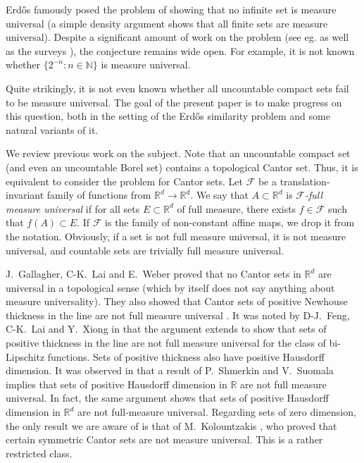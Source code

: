 \documentclass[12pt]{amsart}
\def\R{{\mathbb{R}}}
\def\N{{\mathbb{N}}}
\numberwithin{theorem}{section}
\numberwithin{equation}{section}
\begin{document}
Erd\H{o}s famously posed the problem of showing that no infinite set is measure universal (a simple density argument shows that all finite sets are measure universal). Despite a significant amount of work on the problem (see eg.\cite{Falconer84, Eigen85, Bourgain87, Kolountzakis97} as well as the surveys \cite{Svetic00, JLM25}), the conjecture remains wide open. For example, it is not known whether $\{ 2^{-n}:n\in\N\}$ is measure universal.

Quite strikingly, it is not even known whether all uncountable compact sets fail to be measure universal. The goal of the present paper is to make progress on this question, both in the setting of the Erd\H{o}s similarity problem and some natural variants of it.

We review previous work on the subject. Note that an uncountable compact set (and even an uncountable Borel set) contains a topological Cantor set. Thus, it is equivalent to consider the problem for Cantor sets. Let $\mathcal{F}$ be a translation-invariant family of functions from $\R^d\to\R^d$. We say that $A\subset\R^d$ is \emph{$\mathcal{F}$-full measure universal} if for all sets $E\subset\R^d$ of full measure, there exists $f\in\mathcal{F}$ such that $f(A)\subset E$. If $\mathcal{F}$ is the family of non-constant affine maps, we drop it from the notation. Obviously, if a set is not full measure universal, it is not measure universal, and countable sets are trivially full measure universal.

J.~Gallagher, C-K.~Lai and E.~Weber \cite[Theorem 1.4]{GLW23} proved that no Cantor sets in $\R^d$ are universal in a topological sense (which by itself does not say anything about measure universality). They also showed that Cantor sets of positive Newhouse thickness in the line are not full measure universal \cite[Theorem 1.5]{GLW23}. It was noted by D-J.~Feng, C-K.~Lai and Y.~Xiong in \cite{FLX24} that the argument extends to show that sets of positive thickness in the line are not full measure universal for the class of bi-Lipschitz functions. Sets of positive thickness also have positive Hausdorff dimension. It was observed in \cite[Corollary 3.8]{JLM25} that a result of P.~Shmerkin and V.~Suomala \cite[Theorem 13.1]{SS18} implies that sets of positive Hausdorff dimension in $\R$ are not full measure universal. In fact, the same argument shows that sets of positive Hausdorff dimension in $\R^d$ are not full-measure universal. Regarding sets of zero dimension, the only result we are aware of is that of M.~Kolountzakis \cite{Kolountzakis23}, who proved that certain symmetric Cantor sets are not measure universal. This is a rather restricted class.
\end{document}
